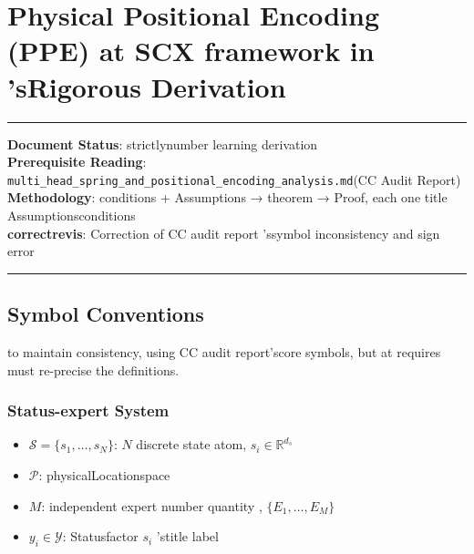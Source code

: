 \documentclass[
  12pt,
]{article}
\author{SCX}
\date{2026}
\providecommand{\tightlist}{%
  \setlength{\itemsep}{0pt}\setlength{\parskip}{0pt}}
\begin{document}
\section{Physical Positional Encoding (PPE) at  SCX
framework in 'sRigorous Derivation}\label{physical-positional-encoding-ppe-ux5728-scx-ux6846ux67b6ux4e2dux7684ux4e25ux5bc6ux63a8ux5bfc}

\begin{center}\rule{0.5\linewidth}{0.5pt}\end{center}

\textbf{Document Status}: strictlynumber learning derivation\\
\textbf{Prerequisite Reading}:
\texttt{multi\_head\_spring\_and\_positional\_encoding\_analysis.md}(CC
Audit Report)\\
\textbf{Methodology}: conditions + Assumptions → theorem  → Proof, each one title Assumptionsconditions\\
\textbf{correctrevis}: Correction of CC audit report 'ssymbol inconsistency and sign error

\begin{center}\rule{0.5\linewidth}{0.5pt}\end{center}

\subsection{Symbol Conventions}\label{ux7b26ux53f7ux7ea6ux5b9a}

to maintain consistency, using  CC audit report'score symbols, but at requires must re-precise the definitions. 

\subsubsection{Status-expert System}\label{ux72b6ux6001-ux4e13ux5bb6ux7cfbux7edf}

\begin{itemize}
\tightlist
\item
  \(\mathcal{S} = \{s_1, \ldots, s_N\}\): \(N\)
  discrete state atom, \(s_i \in \mathbb{R}^{d_s}\)
\item
  \(\mathcal{P}\): physicalLocationspace 
\item
  \(M\): independent expert number quantity , \(\{E_1, \ldots, E_M\}\)
\item
  \(y_i \in \mathcal{Y}\): Statusfactor  \(s_i\) 'stitle label
\end{itemize}
\end{document}
